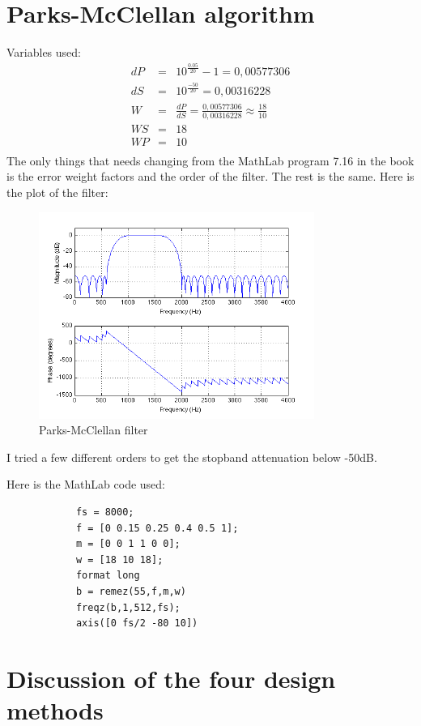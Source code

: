 \documentclass[a4wide,10pt]{article}
\begin{document}
	\section{Parks-McClellan algorithm} %
	\label{sec:parks_mcclellan_algorithm}
		Variables used:
		\begin{eqnarray}
			dP &=& 10^{\frac{0.05}{20}} -1 = 0,00577306 \nonumber \\
			dS &=& 10^{\frac{-50}{20}} = 0,00316228 \nonumber \\
			W &=& \frac{dP}{dS} = \frac{0,00577306}{0,00316228} \approx \frac{18}{10} \nonumber \\
			WS &=& 18 \nonumber \\
			WP &=& 10 \nonumber \\
		\end{eqnarray}
		The only things that needs changing from the MathLab program 7.16 in the book is the error weight factors and the order of the filter. The rest is the same. Here is the plot of the filter:
		\begin{figure}[h]
			\centering
				\includegraphics[width=9cm]{images/opgave_4.png}
			\caption{Parks-McClellan filter}
			\label{fig:images_opgave_4}
		\end{figure}
		I tried a few different orders to get the stopband attenuation below -50dB.
		
		Here is the MathLab code used:
		\begin{verbatim}
			fs = 8000;
			f = [0 0.15 0.25 0.4 0.5 1];
			m = [0 0 1 1 0 0];
			w = [18 10 18];
			format long
			b = remez(55,f,m,w)
			freqz(b,1,512,fs);
			axis([0 fs/2 -80 10])
		\end{verbatim}
\newpage
	\section{Discussion of the four design methods} %
	\label{sec:discussion_of_the_four_design_methods}
\end{document}
